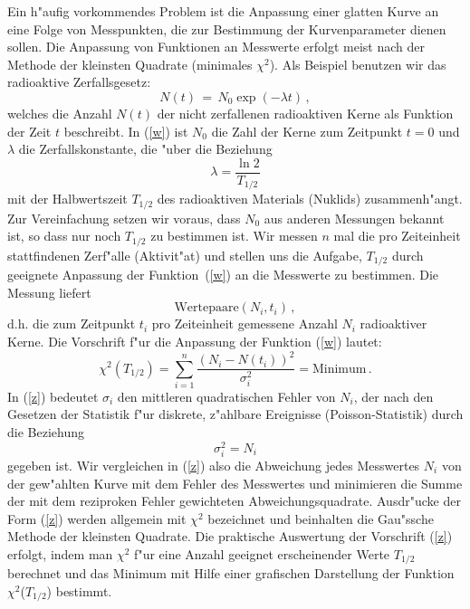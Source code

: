 Ein h"aufig vorkommendes Problem ist die Anpassung einer glatten
Kurve an eine Folge von Messpunkten, die zur Bestimmung der
Kurvenparameter dienen sollen. Die Anpassung von Funktionen an
Messwerte erfolgt meist nach der Methode der kleinsten Quadrate
(minimales $\chi^2$). Als Beispiel benutzen wir das radioaktive
Zerfallsgesetz:
%
\begin{equation} \label{w}
  N(t)\,=\,N_{0} \exp(-\lambda t) \, ,
\end{equation}
%
welches die Anzahl $N(t)$ der nicht zerfallenen
radioaktiven Kerne als Funktion der Zeit $t$ beschreibt. In
(\ref{w}) ist $N_0$ die Zahl der Kerne zum Zeitpunkt $t=0$ und
$\lambda$ die Zerfallskonstante, die "uber die Beziehung
%
\begin{equation} \label{x}
  \lambda = \frac{\ln 2}{T_{1/2}}
\end{equation}
%
mit der Halbwertszeit $T_{1/2}$ des radioaktiven Materials
(Nuklids) zusammenh"angt. Zur Vereinfachung setzen wir voraus, dass
$N_0$ aus anderen Messungen bekannt ist, so dass nur noch
$T_{1/2}$ zu bestimmen ist. Wir messen $n$ mal die pro Zeiteinheit
stattfindenen Zerf"alle (Aktivit"at) und stellen uns die Aufgabe,
$T_{1/2}$ durch geeignete Anpassung der Funktion~(\ref{w}) an die
Messwerte zu bestimmen. Die Messung liefert
%
\begin{equation} \label{y}
 \mbox{Wertepaare} (N_i, t_i) \, ,
\end{equation}
%
d.h. die zum Zeitpunkt $t_i$ pro Zeiteinheit gemessene Anzahl
$N_i$ radioaktiver Kerne. Die Vorschrift f"ur die Anpassung der
Funktion (\ref{w}) lautet:
%
\begin{equation} \label{z}
  \chi^{2}(T_{1/2}) =
    \sum_{i=1}^{n} \frac{(N_{i}-N(t_{i}))^{2}}{\sigma_{i}^{2}} = \mbox{Minimum} \, .
\end{equation}
%
In (\ref{z}) bedeutet $\sigma_i$ den mittleren quadratischen
Fehler von $N_i$, der nach den Gesetzen der Statistik f"ur
diskrete, z"ahlbare Ereignisse
(Poisson-Statistik) durch die Beziehung
%
\begin{equation} \label{aa}
  \sigma_i^2 = N_i
\end{equation}
%
gegeben ist. Wir vergleichen in (\ref{z}) also die Abweichung jedes
Messwertes $N_i$ von der gew"ahlten Kurve mit dem Fehler des
Messwertes und minimieren die Summe der mit dem reziproken Fehler
gewichteten Abweichungsquadrate.
Ausdr"ucke der Form (\ref{z}) werden allgemein mit $\chi^2$
bezeichnet und beinhalten die Gau"ssche Methode der kleinsten
Quadrate. Die praktische Auswertung der Vorschrift (\ref{z})
erfolgt, indem man $\chi^2$ f"ur eine Anzahl geeignet erscheinender
Werte $T_{1/2}$ berechnet und das Minimum mit Hilfe einer grafischen
Darstellung der Funktion $\chi^2$($T_{1/2}$) bestimmt.